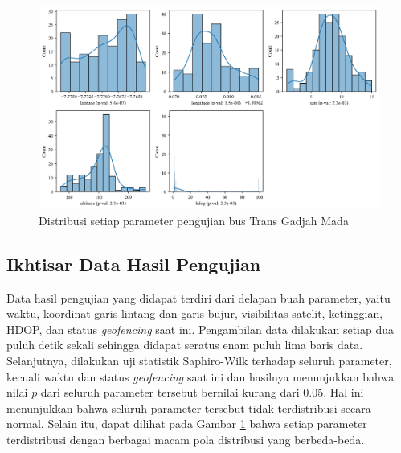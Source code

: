 \begin{figure}[H]
	\centering
	\begin{adjustbox}{width=\textwidth}
		\includegraphics{contents/chapter-4/pengujian-bergerak/distribusi.png}
	\end{adjustbox}
	\caption{Distribusi setiap parameter pengujian bus Trans Gadjah Mada}
	\label{Fig: moving-distribusi}
\end{figure}

\subsection{Ikhtisar Data Hasil Pengujian}
Data hasil pengujian yang didapat terdiri dari delapan buah parameter, yaitu waktu, koordinat garis lintang dan garis bujur, visibilitas satelit, ketinggian, HDOP, dan status \textit{geofencing} saat ini. Pengambilan data dilakukan setiap dua puluh detik sekali sehingga didapat seratus enam puluh lima baris data. Selanjutnya, dilakukan uji statistik Saphiro-Wilk terhadap seluruh parameter, kecuali waktu dan status \textit{geofencing} saat ini dan hasilnya menunjukkan bahwa nilai $p$ dari seluruh parameter tersebut bernilai kurang dari 0.05. Hal ini menunjukkan bahwa seluruh parameter tersebut tidak terdistribusi secara normal. Selain itu, dapat dilihat pada Gambar \ref{Fig: moving-distribusi} bahwa setiap parameter terdistribusi dengan berbagai macam pola distribusi yang berbeda-beda.

